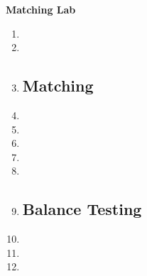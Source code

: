 \documentclass[a4paper,12pt]{article}
\begin{document}
\begin{center}
\textbf{Matching Lab}
\end{center}


\begin{enumerate}\itemsep0.5em

\subsection*{Balance Testing}

\item %
\item %
\item %


\subsection*{Matching}

\item %
\item %

\item %
\item %
\item %
\item %


\subsection*{Balance Testing}

\item %
\item %
\item %


\end{enumerate}
\end{document}
